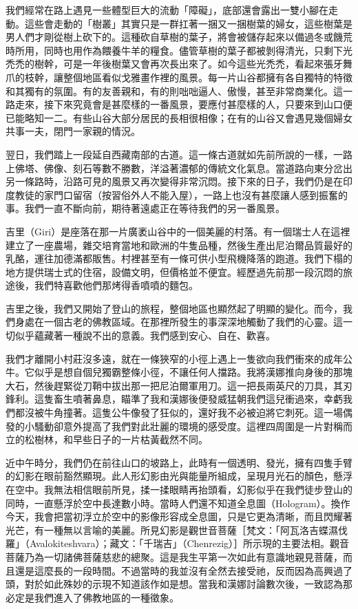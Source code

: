 我們經常在路上遇見一些體型巨大的流動「障礙」，底部還會露出一雙小腳在走動。這些會走動的「樹叢」其實只是一群扛著一捆又一捆樹葉的婦女，這些樹葉是男人們才剛從樹上砍下的。這種砍自草樹的葉子，將會被儲存起來以備過冬或饑荒時所用，同時也用作為餵養牛羊的糧食。儘管草樹的葉子都被剝得清光，只剩下光禿禿的樹幹，可是一年後樹葉又會再次長出來了。如今這些光禿禿，看起來張牙舞爪的枝幹，讓整個地區看似戈雅畫作裡的風景。每一片山谷都擁有各自獨特的特徵和其獨有的氛圍。有的友善親和，有的則咄咄逼人、傲慢，甚至非常商業化。這一路走來，接下來究竟會是甚麼樣的一番風景，要應付甚麼樣的人，只要來到山口便已能略知一二。有些山谷大部分居民的長相很相像；在有的山谷又會遇見幾個婦女共事一夫，閉門一家親的情況。

翌日，我們踏上一段延自西藏南部的古道。這一條古道就如先前所說的一樣，一路上佛塔、佛像、刻石等數不勝數，洋溢著濃郁的傳統文化氣息。當道路向東分岔出另一條路時，沿路可見的風景又再次變得非常沉悶。接下來的日子，我們仍是在印度教徒的家門口留宿（按習俗外人不能入屋），一路上也沒有甚麼讓人感到振奮的事。我們一直不斷向前，期待著遠處正在等待我們的另一番風景。

吉里（Giri）是座落在那一片廣袤山谷中的一個美麗的村落。有一個瑞士人在這裡建立了一座農場，雜交培育當地和歐洲的牛隻品種，然後生產出尼泊爾品質最好的乳酪，運往加德滿都販售。村裡甚至有一條可供小型飛機降落的跑道。我們下榻的地方提供瑞士式的住宿，設備文明，但價格並不便宜。經歷過先前那一段沉悶的旅途後，我們特喜歡他們那烤得香噴噴的麵包。

吉里之後，我們又開始了登山的旅程，整個地區也顯然起了明顯的變化。而今，我們身處在一個古老的佛教區域。在那裡所發生的事深深地觸動了我們的心靈。這一切似乎蘊藏著一種說不出的意義。我們感到安心、自在、歡喜。

我們才離開小村莊沒多遠，就在一條狹窄的小徑上遇上一隻欲向我們衝來的成年公牛。它似乎是想自個兒獨霸整條小徑，不讓任何人擋路。我將漢娜推向身後的那塊大石，然後趕緊從刀鞘中拔出那一把尼泊爾軍用刀。這一把長兩英尺的刀具，其刃鋒利。這隻畜生噴著鼻息，瞄準了我和漢娜後便發威猛朝我們這兒衝過來，幸虧我們都沒被牛角撞著。這隻公牛像發了狂似的，還好我不必被迫將它刺死。這一場偶發的小騷動卻意外提高了我們對此壯麗的環境的感受度。這裡四周圍是一片對稱而立的松樹林，和早些日子的一片枯黃截然不同。

近中午時分，我們仍在前往山口的坡路上，此時有一個透明、發光，擁有四隻手臂的幻影在眼前豁然顯現。此人形幻影由光與能量所組成，呈現月光石的顏色，懸浮在空中。我無法相信眼前所見，揉一揉眼睛再抬頭看，幻影似乎在我們徒步登山的同時，一直懸浮於空中長達數小時。當時人們還不知道全息圖（Hologram）。換作今天，我會把當初浮立於空中的影像形容成全息圖，只是它更為清晰，而且閃耀著光芒，有一種無以言喻的美麗。所見幻影是觀世音菩薩［梵文：「阿瓦洛吉蝶濕伐羅」（Avalokiteshvara）；藏文：「千瑞吉」（Chenrezig）］所示現的主要法相。觀音菩薩乃為一切諸佛菩薩慈悲的總聚。這是我生平第一次如此有意識地親見菩薩，而且還是這麼長的一段時間。不過當時的我並沒有全然去接受祂，反而因為高興過了頭，對於如此殊妙的示現不知道該作如是想。當我和漢娜討論數次後，一致認為那必定是我們進入了佛教地區的一種徵象。

